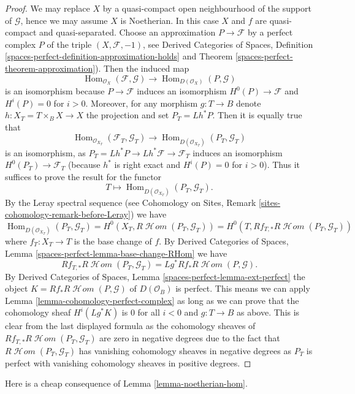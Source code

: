 \documentclass{stacks-project}
\theoremstyle{plain}
\theoremstyle{definition}
\theoremstyle{remark}
\numberwithin{equation}{subsection}
\def\Hom{\mathop{\mathrm{Hom}}\nolimits}
\def\SheafHom{\mathop{\mathcal{H}\!\mathit{om}}\nolimits}
\begin{document}
\begin{proof}
We may replace $X$ by a quasi-compact open neighbourhood of
the support of $\mathcal{G}$, hence we may assume $X$ is Noetherian.
In this case $X$ and $f$ are quasi-compact and quasi-separated.
Choose an approximation $P \to \mathcal{F}$ by a perfect complex $P$ of
the triple $(X, \mathcal{F}, -1)$, see
Derived Categories of Spaces, Definition
\ref{spaces-perfect-definition-approximation-holds} and
Theorem \ref{spaces-perfect-theorem-approximation}).
Then the induced map
$$
\Hom_{\mathcal{O}_X}(\mathcal{F}, \mathcal{G})
\longrightarrow
\Hom_{D(\mathcal{O}_X)}(P, \mathcal{G})
$$
is an isomorphism because $P \to \mathcal{F}$ induces an isomorphism
$H^0(P) \to \mathcal{F}$ and $H^i(P) = 0$ for $i > 0$.
Moreover, for any morphism $g : T \to B$
denote $h : X_T = T \times_B X \to X$ the projection and set
$P_T = Lh^*P$. Then it is equally true that
$$
\Hom_{\mathcal{O}_{X_T}}(\mathcal{F}_T, \mathcal{G}_T)
\longrightarrow
\Hom_{D(\mathcal{O}_{X_T})}(P_T, \mathcal{G}_T)
$$
is an isomorphism, as $P_T = Lh^*P \to Lh^*\mathcal{F} \to \mathcal{F}_T$
induces an isomorphism $H^0(P_T) \to \mathcal{F}_T$ (because $h^*$ is
right exact and $H^i(P) = 0$ for $i > 0$). Thus it suffices to prove the
result for the functor
$$
T \longmapsto \Hom_{D(\mathcal{O}_{X_T})}(P_T, \mathcal{G}_T).
$$
By the Leray spectral sequence (see Cohomology on Sites, Remark
\ref{sites-cohomology-remark-before-Leray}) we have
$$
\Hom_{D(\mathcal{O}_{X_T})}(P_T, \mathcal{G}_T) =
H^0(X_T, R\SheafHom(P_T, \mathcal{G}_T)) =
H^0(T, Rf_{T, *}R\SheafHom(P_T, \mathcal{G}_T))
$$
where $f_T : X_T \to T$ is the base change of $f$. By
Derived Categories of Spaces, Lemma
\ref{spaces-perfect-lemma-base-change-RHom}
we have
$$
Rf_{T, *}R\SheafHom(P_T, \mathcal{G}_T) = Lg^*Rf_*R\SheafHom(P, \mathcal{G}).
$$
By
Derived Categories of Spaces, Lemma
\ref{spaces-perfect-lemma-ext-perfect}
the object $K = Rf_*R\SheafHom(P, \mathcal{G})$ of $D(\mathcal{O}_B)$
is perfect. This means we can apply
Lemma \ref{lemma-cohomology-perfect-complex}
as long as we can prove that the cohomology sheaf
$H^i(Lg^*K)$ is $0$ for all $i < 0$ and $g : T \to B$ as above.
This is clear from the last displayed formula as
the cohomology sheaves of
$Rf_{T, *}R\SheafHom(P_T, \mathcal{G}_T)$
are zero in negative degrees
due to the fact that $R\SheafHom(P_T, \mathcal{G}_T)$ has vanishing
cohomology sheaves in negative degrees as $P_T$ is perfect with
vanishing cohomology sheaves in positive degrees.
\end{proof}

\noindent
Here is a cheap consequence of Lemma \ref{lemma-noetherian-hom}.
\end{document}

